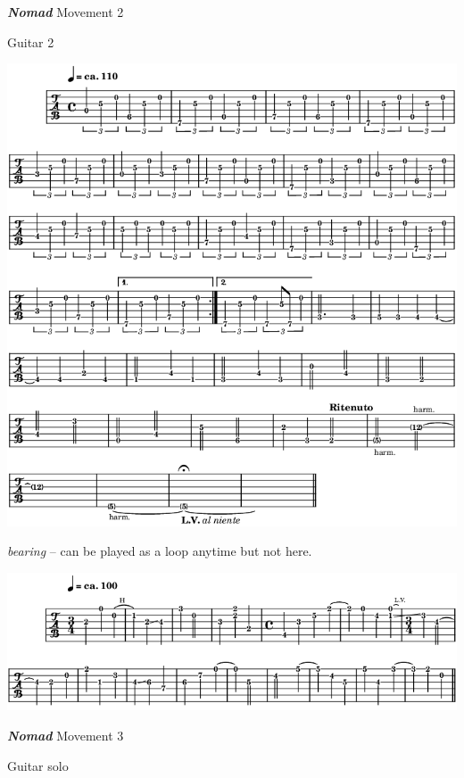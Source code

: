\newpage
 \textbf{\textsl{Nomad}} Movement 2 

\smallskip

 \quad Guitar 2

\begin{center}
\includegraphics[width=\textwidth-1cm]{img/neB2}
\end{center}

 \quad \quad \quad \textit{bearing}  {\scriptsize -- can be played as a loop anytime but not here.}
 
\begin{center}
\includegraphics[width=\textwidth-1cm]{img/neB2r}
\end{center}

\newpage

 \textbf{\textsl{Nomad}} Movement 3 

\smallskip

 \quad Guitar solo

